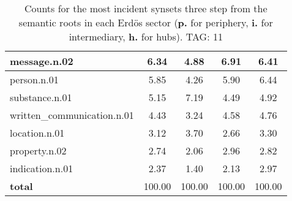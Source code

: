 \begin{table}[h!]
\begin{center}
\begin{tabular}{| l || c | c | c | c |}
message.n.02 & 6.34  & 4.88  & 6.91  & 6.41 \\\hline
person.n.01 & 5.85  & 4.26  & 5.90  & 6.44 \\\hline
substance.n.01 & 5.15  & 7.19  & 4.49  & 4.92 \\\hline
written\_communication.n.01 & 4.43  & 3.24  & 4.58  & 4.76 \\\hline
location.n.01 & 3.12  & 3.70  & 2.66  & 3.30 \\\hline
property.n.02 & 2.74  & 2.06  & 2.96  & 2.82 \\\hline
indication.n.01 & 2.37  & 1.40  & 2.13  & 2.97 \\\hline\hline
{{\bf total}} & 100.00  & 100.00  & 100.00  & 100.00 \\\hline
\end{tabular}
\caption{Counts for the most incident synsets three step from the semantic roots in each Erd\"os sector ({\bf p.} for periphery, {\bf i.} for intermediary, {\bf h.} for hubs). TAG: 11}
\end{center}
\end{table}